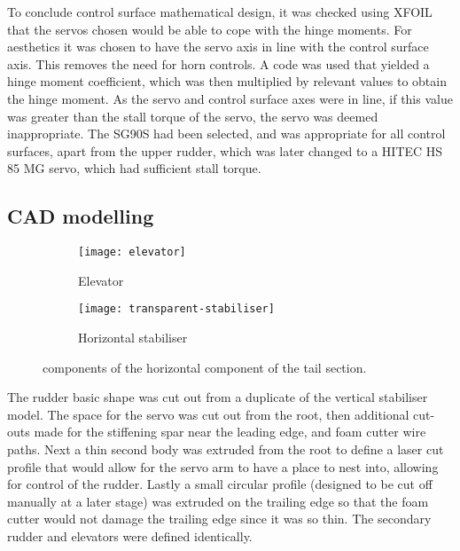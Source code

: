 \documentclass[../../main.tex]{subfiles}
\begin{document}
To conclude control surface mathematical design, it was checked using XFOIL that the servos chosen would be able to cope with the hinge moments.
For aesthetics it was chosen to have the servo axis in line with the control surface axis.
This removes the need for horn controls.
A code was used that yielded a hinge moment coefficient, which was then multiplied by relevant values to obtain the hinge moment.
As the servo and control surface axes were in line, if this value was greater than the stall torque of the servo, the servo was deemed inappropriate.
The SG90S had been selected, and was appropriate for all control surfaces, apart from the upper rudder, which was later changed to a HITEC HS 85 MG servo, which had sufficient stall torque. 

\subsection{CAD modelling} \label{sec:final-design-proposal:control-surfaces:cad-modelling}


\begin{figure}[H]

    \centering
    \begin{subfigure}[b]{0.49\columnwidth}
        \centering
        \texttt{[image: elevator]}
        \caption{Elevator}
        \label{fig:tail-assembly:elevator}
    \end{subfigure}
    \hfill
    \begin{subfigure}[b]{0.49\columnwidth}
        \centering
        \texttt{[image: transparent-stabiliser]}
        \caption{Horizontal stabiliser}
        \label{fig:tail-assembly:horizontal-stabiliser}
    \end{subfigure}
    
    \caption{components of the horizontal component of the tail section.}
    \label{fig:tail-assembly}
\end{figure} 

The rudder basic shape was cut out from a duplicate of the vertical stabiliser model.
The space for the servo was cut out from the root, then additional cut-outs made for the stiffening spar near the leading edge, and foam cutter wire paths.
Next a thin second body was extruded from the root to define a laser cut profile that would allow for the servo arm to have a place to nest into, allowing for control of the rudder.
Lastly a small circular profile (designed to be cut off manually at a later stage) was extruded on the trailing edge so that the foam cutter would not damage the trailing edge since it was so thin.
The secondary rudder and elevators were defined identically. 
\end{document}

